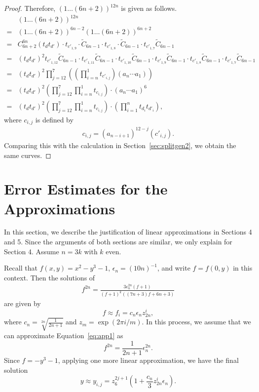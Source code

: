 \documentclass[10pt,a4paper,reqno]{amsart}
\theoremstyle{definition}
\numberwithin{equation}{section}
\numberwithin{figure}{section}
\newcommand{\ep}{\epsilon}
\begin{document}
\begin{proof}
Therefore, $(1\dots (6n+2))^{12n}$ is given as follows.
\begin{align*}
&(1\dots (6n+2))^{12n}\\
=&(1\dots (6n+2))^{6n-2}(1\dots (6n+2))^{6n+2}\\
=&C_{6n+2}^{6n} (t_{d} t_{d'}) \cdot t_{{c}'_{1,9}} \cdot \tilde{C}_{6n-1}\cdot  t_{{c}'_{1,8}}\cdot \tilde{C}_{6n-1} \cdot t_{{c}'_{1,7}} \tilde{C}_{6n-1} \\
=&(t_{d} t_{d'})^2 t_{{c}'_{1,12}} \tilde{C}_{6n-1} \cdot t_{{c}'_{1,11}} \tilde{C}_{6n-1} \cdot t_{{c}'_{1,10}}  \tilde{C}_{6n-1}
 \cdot t_{{c}'_{1,9}}  \tilde{C}_{6n-1}\cdot  t_{{c}'_{1,8}} \tilde{C}_{6n-1} \cdot t_{{c}'_{1,7}} \tilde{C}_{6n-1} \\
=&(t_{d} t_{d'})^2 \prod_{j=12}^7\left( (\prod_{i=n}^1 t_{{c}'_{i,j}}) (a_n \cdots a_1) \right) \\
=&(t_{d} t_{d'})^2 \left(\prod_{j=12}^7 \prod_{i=n}^1 t_{c_{i,j}} \right) \cdot (a_n\cdots a_1)^6 \\
=&(t_{d} t_{d'})^2 \left(\prod_{j=12}^7 \prod_{i=n}^1 t_{c_{i,j}} \right) \cdot \left( \prod_{i=1}^n t_{d_{i}}t_{d'_{i}} \right),
\end{align*}
where $c_{i,j}$ is defined by
\begin{align} \label{eq:vc_comb2}
c_{i,j}= (a_{n-i+1})^{12-j}({c}'_{i,j}).\end{align}
Comparing this with the calculation in Section~\ref{sec:splitgen2}, we obtain the same curves.
\end{proof}


\appendix

\section{Error Estimates for the Approximations}
In this section, we describe the justification of linear approximations in Sections 4 and 5.
Since the arguments of both sections are similar, we only explain for Section 4.
Assume $n=3k$ with $k$ even.

Recall that $f(x,y)=x^2-y^3-1$, $\ep_n=(10 n)^{-1}$, and write $f=f(0,y)$ in this context.
Then the solutions of 
\begin{align} 
f^{2n}=\frac{3{\ep_n^{2n}}(f+1)}{(f+1)^k ((7n+3)f+6n+3)} \label{eq:app1}
\end{align}
are given by \[f \approx f_i = c_n {\ep_n}z_{2n}^i ,\]
where $c_n=\sqrt[2n]{\frac{1}{2n+1}}$ and $z_m=\exp(2\pi i/m)$.
In this process, we assume that we can approximate Equation~\eqref{eq:app1} as
\[f^{2n} =\frac{1}{2n+1} {\ep_n^{2n}}.\]
Since $f=-y^3-1$, applying one more linear approximation, we have the final solution
\[y\approx y_{i,j}=z_6^{2j+1}(1+\frac{c_n}{3}z_{2n}^i {\ep_n}).\] 
\end{document}
